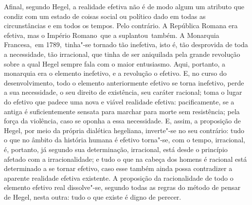 Afinal,
segundo Hegel,
a realidade efetiva não é de modo algum um atributo que condiz com um
estado de coisas social ou político dado em todas as circunstâncias e em
todos os tempos. Pelo contrário. A República Romana era efetiva, mas o
Império Romano \textbar{}\,que a suplantou\,\textbar{} também. A Monarquia Francesa, \textbar{}\,em 1789,\,\textbar{} tinha"-se tornado tão inefetiva, isto é, tão desprovida de toda a
necessidade, tão irracional, que tinha de ser aniquilada pela grande
revolução sobre a qual
Hegel sempre
fala com o maior entusiasmo. Aqui, portanto, a monarquia era o elemento
inefetivo, e a revolução o efetivo. E, no curso do desenvolvimento, todo o
elemento anteriormente efetivo se torna inefetivo, perde a sua
necessidade, o seu direito de existência, seu caráter racional; toma o
lugar do efetivo que padece uma nova e viável realidade efetiva:
pacificamente, se a antiga é suficientemente sensata para marchar para
morte sem resistência; pela força da violência, caso se oponha a essa
necessidade. E, assim, a proposição
de Hegel, por meio da própria dialética
hegeliana, inverte"-se no seu contrário: tudo o que no âmbito da história humana é
efetivo torna"-se, com o tempo, irracional, é, portanto, já segundo sua
determinação, irracional, está desde o princípio afetado com a
irracionalidade; e tudo o que na cabeça dos homens é racional está
determinado a se tornar efetivo, caso esse também ainda possa
contradizer a aparente realidade efetiva existente. A proposição da
racionalidade de todo o elemento efetivo real dissolve"-se, segundo todas
as regras do método de pensar
de Hegel,
nesta outra: tudo o que existe é digno de perecer.

